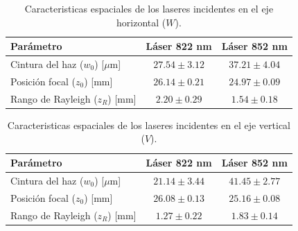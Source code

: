 \begin{table}[htbp]
\centering
\caption{Caracteristicas espaciales de los laseres incidentes en el eje horizontal ($W$).}
\label{tab:caracteristicas_haces_w}
\begin{tabular}{lcc}
\hline
\hline
Parámetro & Láser 822 nm & Láser 852 nm \\
\hline
Cintura del haz ($w_0$) [$\mu$m] & $27.54 \pm 3.12$ & $37.21 \pm 4.04$ \\
Posición focal ($z_0$) [mm] & $26.14 \pm 0.21$ & $24.97 \pm 0.09$ \\
Rango de Rayleigh ($z_R$) [mm] & $2.20 \pm 0.29$ & $1.54 \pm 0.18$ \\
\hline
\hline
\end{tabular}
\end{table}

\begin{table}[htbp]
\centering
\caption{Caracteristicas espaciales de los laseres incidentes en el eje vertical ($V$).}
\label{tab:caracteristicas_haces_v}
\begin{tabular}{lcc}
\hline
\hline
Parámetro & Láser 822 nm & Láser 852 nm \\
\hline
Cintura del haz ($w_0$) [$\mu$m] & $21.14 \pm 3.44$ & $41.45 \pm 2.77$ \\
Posición focal ($z_0$) [mm] & $26.08 \pm 0.13$ & $25.16 \pm 0.08$ \\
Rango de Rayleigh ($z_R$) [mm] & $1.27 \pm 0.22$ & $1.83 \pm 0.14$ \\
\hline
\hline
\end{tabular}
\end{table}
